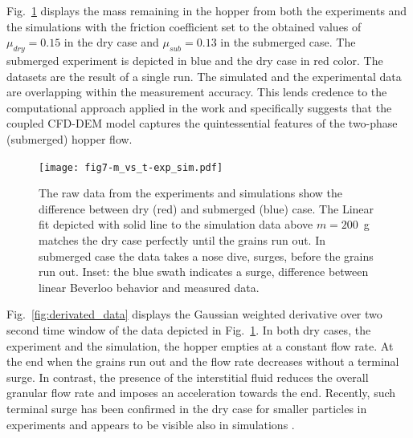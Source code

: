 \documentclass[twoside,twocolumn,9pt]{article}
\begin{document}




Fig.~\ref{fig:flow_rates} displays the mass remaining in the hopper from both the experiments and the simulations with the friction coefficient set to the obtained values of $\mu_{dry}=0.15$ in the dry case and $\mu_{sub}=0.13$ in the submerged case. The submerged experiment is depicted in blue and the dry case in red color. The datasets are the result of a single run. The simulated and the experimental data are overlapping within the measurement accuracy. This lends credence to the computational approach applied in the work and specifically suggests that the coupled CFD-DEM model captures the quintessential features of the two-phase (submerged) hopper flow.
%
\begin{figure}[!t]
 \texttt{[image: fig7-m\_vs\_t-exp\_sim.pdf]}\\
 \caption{The raw data from the experiments and simulations show the difference between dry (red) and submerged (blue) case. The Linear fit depicted with solid line to the simulation data above $m = 200$~g matches the dry case perfectly until the grains run out. In submerged case the data takes a nose dive, surges, before the grains run out. Inset: the blue swath indicates a surge, difference between linear Beverloo behavior and measured data.}
 \label{fig:flow_rates}
\end{figure}

Fig.~\ref{fig:derivated_data} displays the Gaussian weighted derivative over two second time window of the data depicted in Fig.~\ref{fig:flow_rates}. In both dry cases, the experiment and the simulation, the hopper empties at a constant flow rate. 
At the end when the grains run out and the flow rate decreases without a terminal surge. 
In contrast, the presence of the interstitial fluid reduces the overall granular flow rate and imposes an acceleration towards the end. Recently, such terminal surge has been confirmed in the dry case for smaller particles in experiments \cite{koivistoSubmitted} and appears to be visible also in simulations \cite{DunatungaJFM15,SchwartzGM12}.
\end{document}
